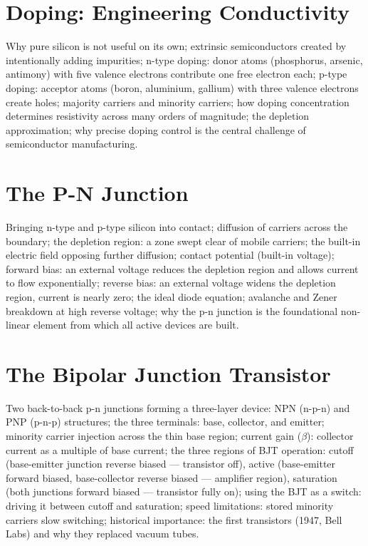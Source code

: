 \chapter{Doping: Engineering Conductivity}
\label{ch:doping}

Why pure silicon is not useful on its own; extrinsic semiconductors created
by intentionally adding impurities; n-type doping: donor atoms (phosphorus,
arsenic, antimony) with five valence electrons contribute one free electron
each; p-type doping: acceptor atoms (boron, aluminium, gallium) with three
valence electrons create holes; majority carriers and minority carriers;
how doping concentration determines resistivity across many orders of
magnitude; the depletion approximation; why precise doping control is the
central challenge of semiconductor manufacturing.

\chapter{The P-N Junction}
\label{ch:pn-junction}

Bringing n-type and p-type silicon into contact; diffusion of carriers across
the boundary; the depletion region: a zone swept clear of mobile carriers;
the built-in electric field opposing further diffusion; contact potential
(built-in voltage); forward bias: an external voltage reduces the depletion
region and allows current to flow exponentially; reverse bias: an external
voltage widens the depletion region, current is nearly zero; the ideal diode
equation; avalanche and Zener breakdown at high reverse voltage; why the
p-n junction is the foundational non-linear element from which all active
devices are built.

\chapter{The Bipolar Junction Transistor}
\label{ch:bjt}

Two back-to-back p-n junctions forming a three-layer device: NPN (n-p-n) and
PNP (p-n-p) structures; the three terminals: base, collector, and emitter;
minority carrier injection across the thin base region; current gain
(\(\beta\)): collector current as a multiple of base current; the three
regions of BJT operation: cutoff (base-emitter junction reverse biased —
transistor off), active (base-emitter forward biased, base-collector reverse
biased — amplifier region), saturation (both junctions forward biased —
transistor fully on); using the BJT as a switch: driving it between cutoff
and saturation; speed limitations: stored minority carriers slow switching;
historical importance: the first transistors (1947, Bell Labs) and why they
replaced vacuum tubes.


